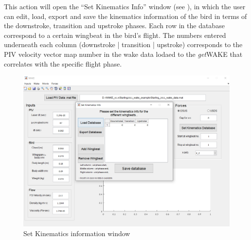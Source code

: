 \documentclass[12pt,a4paper]{article}
\begin{document}
\newpage
This action will open the ``Set Kinematics Info'' window (see ), in which the user can edit, load, export and save the kinematics information of the bird in terms of the downstroke, transition and upstroke phases.
Each row in the database correspond to a certain wingbeat in the bird's flight. 
The numbers entered underneath each column (downstroke | transition | upstroke) corresponds to the PIV velocity vector map number in the wake data lodaed to the \textit{get}WAKE that correlates with the specific flight phase.

\begin{figure}[ht!]
	\centering
	\includegraphics[width=\textwidth]{kinematics-database-window}
	\caption{Set Kinematics information window}
	\label{fig:GUI-kinematics-database-window}
\end{figure}
\end{document}
